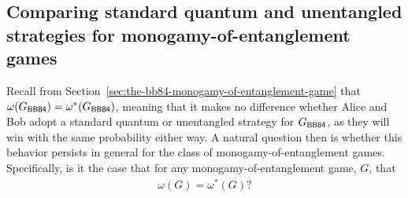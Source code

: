 %
%
%
%
%

\subsection{Comparing standard quantum and unentangled strategies for monogamy-of-entanglement games} \label{sec:monog-classical-quantum}

Recall from Section~\ref{sec:the-bb84-monogamy-of-entanglement-game} that $\omega(G_{\BB84}) = \omega^*(G_{\BB84})$, meaning that it makes no difference whether Alice and Bob adopt a standard quantum or unentangled strategy for $G_{\BB84}$, as they will win with the same probability either way. A natural question then is whether this behavior persists in general for the class of monogamy-of-entanglement games. Specifically, is it the case that for any monogamy-of-entanglement game, $G$, that 
\begin{align}
	\omega(G) = \omega^*(G)?
\end{align}

